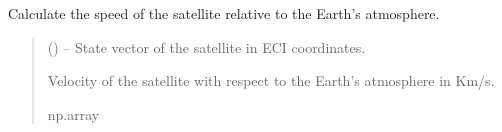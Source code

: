 \documentclass[letterpaper,10pt,english]{sphinxmanual}
\begin{document}

\begin{fulllineitems}
\label{\detokenize{fspsim.utils:fspsim.utils.Conversions.v_rel}}
\pysigstartsignatures
{}
\pysigstopsignatures
\sphinxAtStartPar
Calculate the speed of the satellite relative to the Earth’s atmosphere.
\begin{quote}\begin{description}
\sphinxAtStartPar
{} () – State vector of the satellite in ECI coordinates.

\sphinxAtStartPar
Velocity of the satellite with respect to the Earth’s atmosphere in Km/s.

\sphinxAtStartPar
np.array

\end{description}\end{quote}

\end{fulllineitems}

\end{document}
